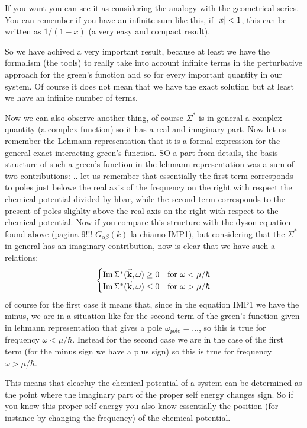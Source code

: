 \documentclass[../main/main.tex]{subfiles}
\begin{document}
If you want you can see it as considering the analogy with the geometrical series. You can remember if you have an infinite sum like this, if \( \abs{x}<1  \), this can be written as \( 1/(1-x) \) (a very easy and compact result).

So we have achived a very important result, because at least we have the formalism (the tools) to really take into account infinite terms in the perturbative approach for the green's function and so for every important quantity in our system. Of course it does not  mean that we have the exact solution but at least we have an infinite number of terms.


Now we can also observe another thing, of course \( \Sigma ^* \) is in general a complex quantity (a complex function) so it has a real and imaginary part.
Now let us remember the Lehmann representation that it is a formal expression for the general exact interacting green's function. SO a part from details, the basis structure of such a green's function in the lehmann representation was a sum of two contributions:
..
let us remember that essentially the first term corresponds to poles just belowe the real axis of the frequency on the right with respect the chemical potential divided by hbar, while the second term corresponds to the present of poles slighlty above the real axis on the right with respect to the chemical potential. Now if you compare this structure with the dyson equation found above (pagina 9!!! \( G_{\alpha \beta } (k) \) la chiamo IMP1), but considering that the \( \Sigma ^* \) in general has an imaginary contribution, now is clear that we have such a relations:
\begin{equation*}
  \begin{cases}
   \Im \Sigma ^* (\va{k},\omega ) \ge 0 & \text{for } \omega < \mu /\hbar \\
   \Im \Sigma ^* (\va{k},\omega ) \le 0 & \text{for } \omega > \mu /\hbar
  \end{cases}
\end{equation*}
of course for the first case it means that, since in the equation IMP1 we have the minus, we are in a situation like for the second term of the green's function given in lehmann representation that gives a pole \( \omega _{pole}=... \), so this is true for frequency \( \omega < \mu /\hbar  \).
Instead for the second case we are in the case of the first term (for the minus sign we have a plus sign) so this is true for frequency \( \omega > \mu /\hbar  \).

This means that clearluy the chemical potential of a system can be determined as the point where the imaginary part of the proper self energy changes sign. So if you know this proper self energy you also know essentially the position (for instance by changing the frequency) of the chemical potential.
\end{document}
